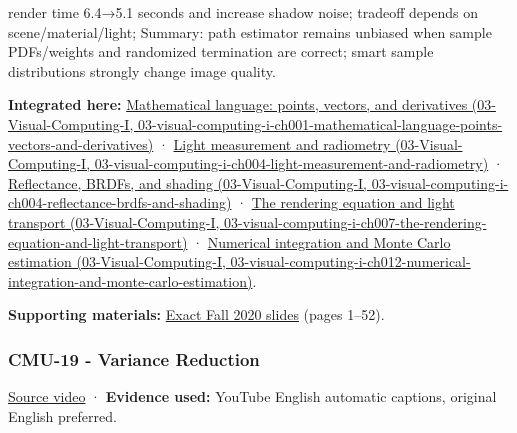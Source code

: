 render time 6.4→5.1 seconds and increase shadow noise; tradeoff depends on scene/material/light; Summary: path estimator remains unbiased when sample PDFs/weights and randomized termination are correct; smart sample distributions strongly change image quality.

\textbf{Integrated here:} \href{../03-Visual-Computing-I/main.pdf\#nameddest=03-visual-computing-i-ch001-mathematical-language-points-vectors-and-derivatives}{Mathematical language: points, vectors, and derivatives (03-Visual-Computing-I, 03-visual-computing-i-ch001-mathematical-language-points-vectors-and-derivatives)} · \href{../03-Visual-Computing-I/main.pdf\#nameddest=03-visual-computing-i-ch004-light-measurement-and-radiometry}{Light measurement and radiometry (03-Visual-Computing-I, 03-visual-computing-i-ch004-light-measurement-and-radiometry)} · \href{../03-Visual-Computing-I/main.pdf\#nameddest=03-visual-computing-i-ch004-reflectance-brdfs-and-shading}{Reflectance, BRDFs, and shading (03-Visual-Computing-I, 03-visual-computing-i-ch004-reflectance-brdfs-and-shading)} · \href{../03-Visual-Computing-I/main.pdf\#nameddest=03-visual-computing-i-ch007-the-rendering-equation-and-light-transport}{The rendering equation and light transport (03-Visual-Computing-I, 03-visual-computing-i-ch007-the-rendering-equation-and-light-transport)} · \href{../03-Visual-Computing-I/main.pdf\#nameddest=03-visual-computing-i-ch012-numerical-integration-and-monte-carlo-estimation}{Numerical integration and Monte Carlo estimation (03-Visual-Computing-I, 03-visual-computing-i-ch012-numerical-integration-and-monte-carlo-estimation)}.

\textbf{Supporting materials:} \href{https://15462.courses.cs.cmu.edu/fall2020content/lectures/18_montecarloraytracing/18_montecarloraytracing_slides.pdf}{Exact Fall 2020 slides} (pages 1--52).

\subsubsection{CMU-19 - Variance Reduction}\label{04-visual-computing-ii-ch036-cmu-19---variance-reduction}

\href{https://www.youtube.com/watch?v=IQhLk_XaFc8}{Source video} · \textbf{Evidence used:} YouTube English automatic captions, original English preferred.

